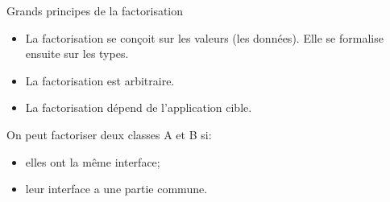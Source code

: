 \documentclass[dvipsnames]{beamer}
\begin{document}
\begin{frame}
    [fragile]{Grands principes de la factorisation}

    \begin{itemize}
        \item La factorisation se conçoit sur les valeurs (les données). Elle se
              formalise \alert{ensuite} sur les types.
        \item La factorisation est arbitraire.
        \item La factorisation dépend de l'application cible.
    \end{itemize}


    On peut factoriser deux classes A et B si:
    \begin{itemize}
        \item elles ont la même interface;
        \item leur interface a une partie commune.
    \end{itemize}

\end{frame}
\end{document}
